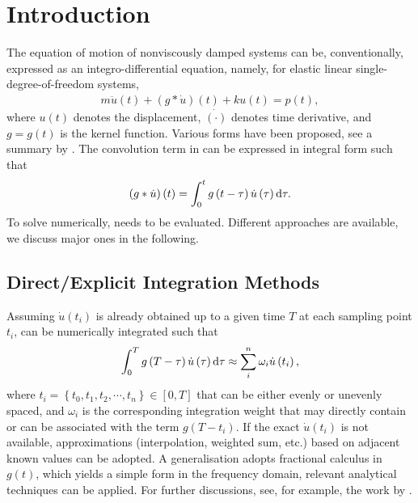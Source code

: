 \section{Introduction}
The equation of motion of nonviscously damped systems can be, conventionally, expressed as an integro-differential equation, namely, for elastic linear single-degree-of-freedom systems,
\begin{gather}\label{eq:single_eom}
m\ddot{u}\left(t\right)+\left(g*\dot{u}\right)\left(t\right)+ku\left(t\right)=p\left(t\right),
\end{gather}
where $u(t)$ denotes the displacement, $\dot{(\cdot)}$ denotes time derivative, and $g=g(t)$ is the kernel function. Various forms have been proposed, see a summary by \citet[][Table 1]{Adhikari2003}.
The convolution term in  can be expressed in integral form such that
\begin{gather}\label{eq:conv}
\left(g*\dot{u}\right)\left(t\right)=\int_0^tg\left(t-\tau\right)\dot{u}\left(\tau\right)\mathrm{d}\tau.
\end{gather}
To solve  numerically,  needs to be evaluated. Different approaches are available, we discuss major ones in the following.
\subsection{Direct/Explicit Integration Methods}
Assuming $\dot{u}(t_i)$ is already obtained up to a given time $T$ at each sampling point $t_i$,  can be numerically integrated such that
\begin{gather}
\int_0^Tg\left(T-\tau\right)\dot{u}\left(\tau\right)\mathrm{d}\tau\approx\sum_i^n\omega_i\dot{u}\left(t_i\right),
\end{gather}
where $t_i=\left\{t_0,t_1,t_2,\cdots,t_n\right\}\in[0,T]$ that can be either evenly or unevenly spaced, and $\omega_i$ is the corresponding integration weight that may directly contain or can be associated \citep{Schaedle2006} with the term $g\left(T-t_i\right)$. If the exact $\dot{u}(t_i)$ is not available, approximations (interpolation, weighted sum, etc.) based on adjacent known values can be adopted. A generalisation adopts fractional calculus \citep[e.g.,][]{Bagley1983,Gaul1999} in $g(t)$, which yields a simple form in the frequency domain, relevant analytical techniques can be applied. For further discussions, see, for example, the work by \citet{Fernandez2019}.

